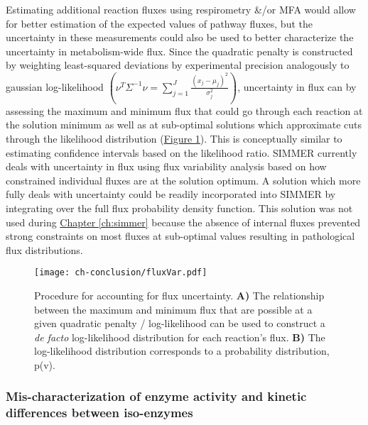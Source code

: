 Estimating additional reaction fluxes using respirometry \&/or MFA would allow for better estimation of the expected values of pathway fluxes, but the uncertainty in these measurements could also be used to better characterize the uncertainty in metabolism-wide flux. Since the quadratic penalty is constructed by weighting least-squared deviations by experimental precision analogously to gaussian log-likelihood $\left(\nu^{T}\Sigma^{-1}\nu = \sum_{j = 1}^{J}\frac{\left(x_{j} - \mu_{j}\right)^2}{\sigma^{2}_j}\right)$, uncertainty in flux can by assessing the maximum and minimum flux that could go through each reaction at the solution minimum as well as at sub-optimal solutions which approximate cuts through the likelihood distribution (\hyperref[conclusion-fluxUncertainty]{Figure \ref{conclusion-fluxUncertainty}}). This is conceptually similar to estimating confidence intervals based on the likelihood ratio. SIMMER currently deals with uncertainty in flux using flux variability analysis \cite{Mahadevan:2003wq} based on how constrained individual fluxes are at the solution optimum. A solution which more fully deals with uncertainty could be readily incorporated into SIMMER by integrating over the full flux probability density function.  This solution was not used during \hyperref[ch:simmer]{Chapter \ref{ch:simmer}} because the absence of internal fluxes prevented strong constraints on most fluxes at sub-optimal values resulting in pathological flux distributions. 

\begin{figure}[h!]
\begin{center}
\texttt{[image: ch-conclusion/fluxVar.pdf]}
\caption[Procedure for accounting for flux uncertainty]{Procedure for accounting for flux uncertainty. \textbf{A)} The relationship between the maximum and minimum flux that are possible at a given quadratic penalty / log-likelihood can be used to construct a \textit{de facto} log-likelihood distribution for each reaction's flux. \textbf{B)} The log-likelihood distribution corresponds to a probability distribution, p(v).}
\label{conclusion-fluxUncertainty}
\end{center}
\end{figure}



\subsubsection{Mis-characterization of enzyme activity and kinetic differences between iso-enzymes}


